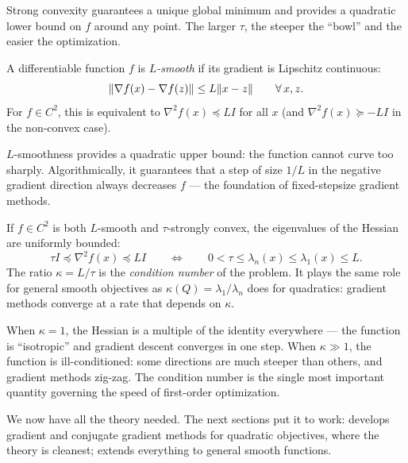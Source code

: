Strong convexity guarantees a unique global minimum and provides a quadratic lower bound on $f$ around any point.
The larger $\tau$, the steeper the ``bowl'' and the easier the optimization.

\begin{defn}[$L$-smoothness]\label{def:L-smooth}
	A differentiable function $f$ is \textit{$L$-smooth} if its gradient is Lipschitz continuous:
	\begin{equation}\label{eq:L-smoothness}
		\lVert\nabla f(x) - \nabla f(z)\rVert \leq L\lVert x - z\rVert \qquad \forall\, x, z.
	\end{equation}
	For $f \in C^2$, this is equivalent to $\nabla^2 f(x) \preceq LI$ for all $x$ (and $\nabla^2 f(x) \succeq -LI$ in the non-convex case).
\end{defn}

$L$-smoothness provides a quadratic upper bound: the function cannot curve too sharply.
Algorithmically, it guarantees that a step of size $1/L$ in the negative gradient direction always decreases $f$ --- the foundation of fixed-stepsize gradient methods.

\begin{thm}\label{thm:hessian-bounds}
	If $f \in C^2$ is both $L$-smooth and $\tau$-strongly convex, the eigenvalues of the Hessian are uniformly bounded:
	\begin{equation}\label{eq:hessian-bounds}
		\tau I \preceq \nabla^2 f(x) \preceq LI
		\qquad \Longleftrightarrow \qquad
		0 < \tau \leq \lambda_n(x) \leq \lambda_1(x) \leq L.
	\end{equation}
	The ratio $\kappa = L / \tau$ is the \textit{condition number} of the problem.
	It plays the same role for general smooth objectives as $\kappa(Q) = \lambda_1 / \lambda_n$ does for quadratics: gradient methods converge at a rate that depends on $\kappa$.
\end{thm}

When $\kappa = 1$, the Hessian is a multiple of the identity everywhere --- the function is ``isotropic'' and gradient descent converges in one step.
When $\kappa \gg 1$, the function is ill-conditioned: some directions are much steeper than others, and gradient methods zig-zag.
The condition number is the single most important quantity governing the speed of first-order optimization.

We now have all the theory needed.
The next sections put it to work:  develops gradient and conjugate gradient methods for quadratic objectives, where the theory is cleanest;  extends everything to general smooth functions.